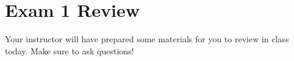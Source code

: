 
\chapter{Exam 1 Review}

Your instructor will have prepared some materials for you to review in class today.  Make sure to ask questions!